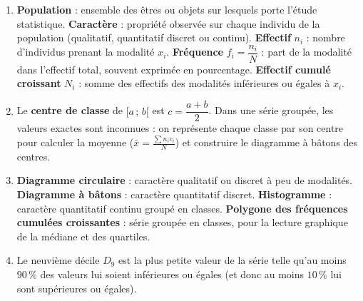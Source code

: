 \documentclass[11pt]{article}
\begin{document}
\begin{corrige}
\begin{enumerate}
    \item \textbf{Population} : ensemble des êtres ou objets sur lesquels porte l'étude statistique. \textbf{Caractère} : propriété observée sur chaque individu de la population (qualitatif, quantitatif discret ou continu). \textbf{Effectif} $n_i$ : nombre d'individus prenant la modalité $x_i$. \textbf{Fréquence} $f_i=\dfrac{n_i}{N}$ : part de la modalité dans l'effectif total, souvent exprimée en pourcentage. \textbf{Effectif cumulé croissant} $N_i$ : somme des effectifs des modalités inférieures ou égales à $x_i$.
    \item Le \textbf{centre de classe} de $[a\,;\,b[$ est $c=\dfrac{a+b}{2}$. Dans une série groupée, les valeurs exactes sont inconnues : on représente chaque classe par son centre pour calculer la moyenne ($\bar{x}=\frac{\sum n_i c_i}{N}$) et construire le diagramme à bâtons des centres.
    \item \textbf{Diagramme circulaire} : caractère qualitatif ou discret à peu de modalités. \textbf{Diagramme à bâtons} : caractère quantitatif discret. \textbf{Histogramme} : caractère quantitatif continu groupé en classes. \textbf{Polygone des fréquences cumulées croissantes} : série groupée en classes, pour la lecture graphique de la médiane et des quartiles.
    \item Le neuvième décile $D_9$ est la plus petite valeur de la série telle qu'au moins $90\,\%$ des valeurs lui soient inférieures ou égales (et donc au moins $10\,\%$ lui sont supérieures ou égales).
\end{enumerate}
\end{corrige}
\end{document}
